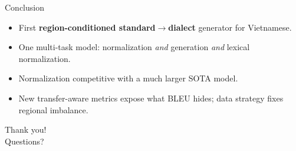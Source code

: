 \documentclass[aspectratio=169,11pt]{beamer}
\newcommand{\hl}[1]{\textcolor{oiblue}{\textbf{#1}}}
\begin{document}
\begin{frame}{Conclusion}
  \begin{itemize}
    \item First \hl{region-conditioned standard$\rightarrow$dialect} generator for Vietnamese.
    \item One multi-task model: normalization \emph{and} generation \emph{and} lexical normalization.
    \item Normalization competitive with a much larger SOTA model.
    \item New transfer-aware metrics expose what BLEU hides; data strategy fixes regional imbalance.
  \end{itemize}
  \vspace{0.6em}
  \centering\Large Thank you! \normalsize\\[0.3em]
  \small Questions?
\end{frame}
\end{document}
